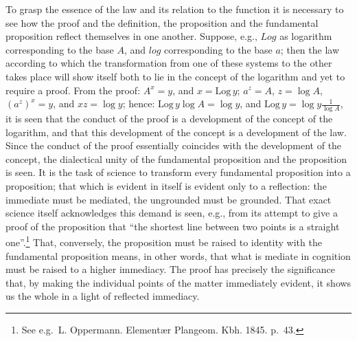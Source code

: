 \documentclass[12pt,a4paper,openany]{book}
\newcommand{\opage}[1]{\marginnote{\footnotesize\textit{[#1]}}}
\begin{document}
To grasp the essence of the law and its relation to the function
it is necessary to see how the proof and the
definition, the proposition and the fundamental proposition reflect
themselves in one another. Suppose, e.g., $Log$ as logarithm corresponding
to the base $A$, and $log$ corresponding to the base $a$; then
the law according to which the transformation from one of
these systems to the other takes place will show itself both to lie
in the concept of the logarithm and yet to require a proof. From
the proof: $A^{x}=y$, and $x=\mathrm{Log}\,y$; $a^{z}=A$, $z=\log A$, $(a^{z})^{x}=y$,
and $xz=\log y$; hence: $\mathrm{Log}\,y \log A=\log y$, and $\mathrm{Log}\,y=\log y \frac{1}{\log A}$, it is seen that the conduct of the proof is a development of the concept of the logarithm,
and that this development of the concept is a development of the law.
Since the conduct of the proof essentially coincides with
the development of the concept, the dialectical unity of the fundamental proposition and the proposition is seen.
It is the task of science to transform
every fundamental proposition into a proposition; that which is evident in itself
is evident only to a reflection: the immediate
must be mediated, the ungrounded must be grounded. That
exact science itself acknowledges this demand is seen, e.g.,
from its attempt to give a proof of the proposition that
\setcounter{footnote}{0}%
\opage{19}``the shortest line between two points is a straight one''.\footnote[1]{See e.g.\ L. Oppermann. Elementær Plangeom. Kbh. 1845. p.\ 43.} That,
conversely, the proposition must be raised to identity with the fundamental proposition
means, in other words, that what is mediate in cognition
must be raised to a higher immediacy. The proof
has precisely the significance that, by making the individual
points of the matter immediately evident, it shows us the whole in a light
of reflected immediacy.
\end{document}
